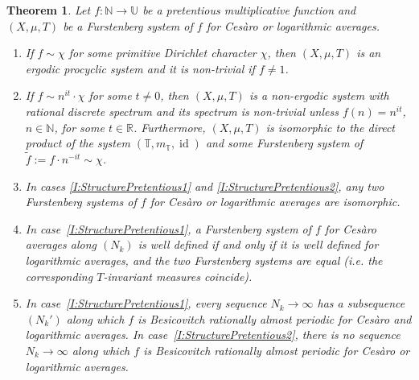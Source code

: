 \documentclass[11pt]{amsart}
\newtheorem{theorem}[lemma]{Theorem}
\theoremstyle{definition}
\newcommand{\N}{{\mathbb N}}
\newcommand{\R}{{\mathbb R}}
\newcommand{\T}{{\mathbb T}}
\newcommand{\U}{{\mathbb U}}
\DeclareMathOperator{\id}{id}
\begin{document}
\begin{theorem}\label{T:StructurePretentiousRefined}
	Let $f\colon \N\to \U$ be a  pretentious multiplicative function and $(X,\mu,T)$ be a
	Furstenberg system of $f$ for Ces\`aro or logarithmic averages.
	\begin{enumerate}
		\item \label{I:StructurePretentious1}  If  $f\sim \chi$  for some primitive Dirichlet character $\chi$, then
		$(X,\mu,T)$ is an ergodic procyclic system and it is non-trivial if $f\neq 1$.
		
		\smallskip
		
		\item \label{I:StructurePretentious2}   If $f\sim  n^{it}\cdot \chi$ for some $t\neq 0$, then
		$(X,\mu,T)$
		is a  non-ergodic system with   rational discrete spectrum  and its spectrum is non-trivial unless $f(n)=n^{it}$, $n\in \N$,  for some $t\in \R$. Furthermore,
		$(X,\mu,T)$ is isomorphic to the direct product of the system $(\T,m_\T,\id)$
		 and some Furstenberg system of $\tilde{f}:=f\cdot n^{-it}\sim \chi$.
		
		\smallskip
		
		\item  \label{I:StructurePretentious2.5}  In cases \eqref{I:StructurePretentious1} and \eqref{I:StructurePretentious2}, any two Furstenberg systems of $f$ for Ces\`aro or logarithmic averages are isomorphic.
		
		\smallskip
		
		\item  \label{I:StructurePretentious2.5'}	 In case~\eqref{I:StructurePretentious1}, a Furstenberg system of $f$ for Ces\`aro averages along $(N_k)$ is well defined if and only if it is well defined for logarithmic averages, and the two Furstenberg systems are equal (i.e. the corresponding $T$-invariant measures coincide).
					
		\smallskip			
					
					
		\item  \label{I:StructurePretentious3}  In case~\eqref{I:StructurePretentious1},   every sequence $N_k\to \infty$ has a subsequence $(N_k')$ along which  $f$ is Besicovitch rationally almost periodic  for Ces\`aro and logarithmic averages. In case~\eqref{I:StructurePretentious2}, there is no sequence  $N_k\to\infty$ along which  $f$ is Besicovitch rationally almost periodic  for Ces\`aro or logarithmic averages.
	\end{enumerate}
\end{theorem}
\end{document}
